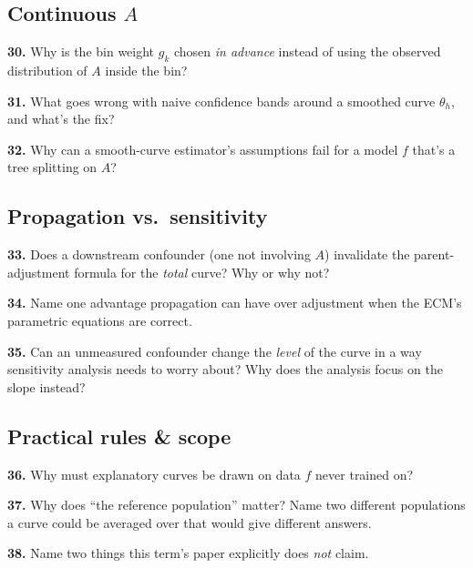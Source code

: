 \documentclass[11pt]{article}
\newcommand{\qa}[2]{\par\noindent\textbf{#1.} #2\par\smallskip}
\begin{document}
\subsection*{Continuous \texorpdfstring{$A$}{A}}
\qa{30}{Why is the bin weight $g_k$ chosen \emph{in advance} instead of
  using the observed distribution of $A$ inside the bin?}
\qa{31}{What goes wrong with naive confidence bands around a smoothed curve
  $\theta_h$, and what's the fix?}
\qa{32}{Why can a smooth-curve estimator's assumptions fail for a model $f$
  that's a tree splitting on $A$?}

\subsection*{Propagation vs.\ sensitivity}
\qa{33}{Does a downstream confounder (one not involving $A$) invalidate the
  parent-adjustment formula for the \emph{total} curve? Why or why not?}
\qa{34}{Name one advantage propagation can have over adjustment when the
  ECM's parametric equations are correct.}
\qa{35}{Can an unmeasured confounder change the \emph{level} of the curve
  in a way sensitivity analysis needs to worry about? Why does the analysis
  focus on the slope instead?}

\subsection*{Practical rules \& scope}
\qa{36}{Why must explanatory curves be drawn on data $f$ never trained on?}
\qa{37}{Why does ``the reference population'' matter? Name two different
  populations a curve could be averaged over that would give different
  answers.}
\qa{38}{Name two things this term's paper explicitly does \emph{not}
  claim.}
\end{document}
